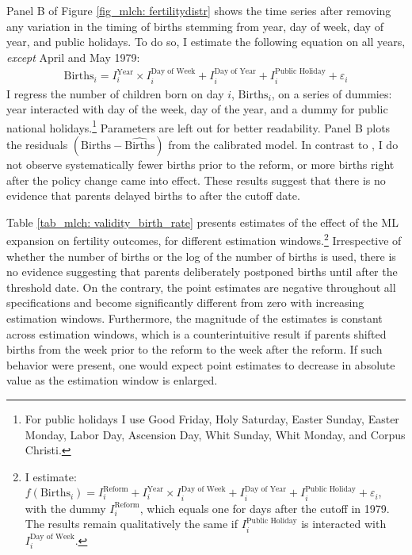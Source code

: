 Panel B of Figure \ref{fig_mlch: fertilitydistr} shows the time series after removing any variation in the timing of births stemming from year, day of week, day of year, and public holidays. To do so, I estimate the following equation on all years, \emph{except} April and May 1979:
\begin{align}
\text{Births}_i = I^{\text{Year}}_i\times I^{\text{Day of Week}}_i + I^{\text{Day of Year}}_i + I^{\text{Public Holiday}}_i + \varepsilon_i \label{eq: validity_fig}
\end{align}
I regress the number of children born on day $i$, $\text{Births}_i$, on a series of dummies: year interacted with day of the week, day of the year, and a dummy for public national holidays.\footnote{For public holidays I use Good Friday, Holy Saturday, Easter Sunday, Easter Monday, Labor Day, Ascension Day, Whit Sunday, Whit Monday, and Corpus Christi.} Parameters are left out for better readability. Panel B plots the residuals $(\text{Births}-\widehat{\text{Births}})$ from the calibrated model. In contrast to \cite{gans2009born}, I do not observe systematically fewer births prior to the reform, or more births right after the policy change came into effect. These results suggest that there is no evidence that parents delayed births to after the cutoff date.


Table \ref{tab_mlch: validity_birth_rate} presents estimates of the effect of the ML expansion on fertility outcomes, for different estimation windows.\footnote{I estimate: $f(\text{Births}_i) = I^{\text{Reform}}_i + I^{\text{Year}}_i\times I^{\text{Day of Week}}_i + I^{\text{Day of Year}}_i + I^{\text{Public Holiday}}_i + \varepsilon_i$, with the dummy $I^{\text{Reform}}_i$, which equals one for days after the cutoff in 1979. The results remain qualitatively the same if $I^{\text{Public Holiday}}_i$ is interacted with $I^{\text{Day of Week}}_i$.} Irrespective of whether the number of births or the log of the number of births is used, there is no evidence suggesting that parents deliberately postponed births until after the threshold date. On the contrary, the point estimates are negative throughout all specifications and become significantly different from zero with increasing estimation windows. Furthermore, the magnitude of the estimates is constant across estimation windows, which is a counterintuitive result if parents shifted births from the week prior to the reform to the week after the reform. If such behavior were present, one would expect point estimates to decrease in absolute value as the estimation window is enlarged. 



